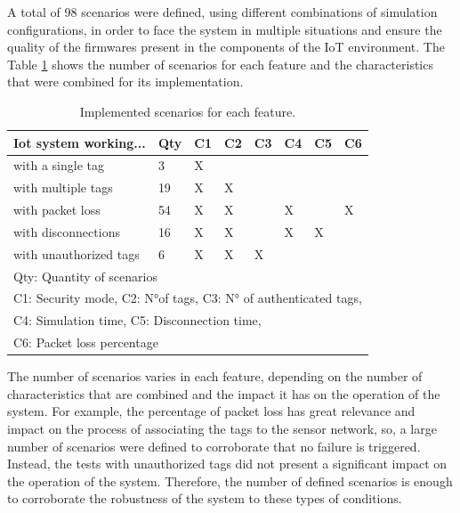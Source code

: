 \documentclass[journal]{IEEEtran}	%
\begin{document}
A total of 98 scenarios were defined, using different combinations of simulation configurations, in order to face the system in multiple situations and ensure the quality of the firmwares present in the components of the IoT environment. The Table \ref{tab:scearios} shows the number of scenarios for each feature and the characteristics that were combined for its implementation.

\begin{table}[h!]
\renewcommand{\arraystretch}{1.25}		%
\centering
\caption{Implemented scenarios for each feature.}	%
\label{tab:scearios}
\begin{tabular}{l|l|l|l|l|l|l|l}					%
\hline \hline
\textbf{Iot system working...}     &   \textbf{Qty}     &	\textbf{C1}     &\textbf{C2}    &\textbf{C3}    &\textbf{C4}    &\textbf{C5}    &\textbf{C6}\\
\hline
with a single tag               &   3   	            &	X   &   &   &   &   &   \\
with multiple tags              &   19  	            &	X   & X &   &   &   &   \\
with packet loss                &   54   	            &	X   & X &   & X &   & X \\
with disconnections      &   16   	            &	X   & X &   & X & X &   \\
with unauthorized tags          &   6   	            &	X   & X & X &   &   &   \\
\hline
\multicolumn{8}{l}{Qty: Quantity of scenarios}	\\
\multicolumn{8}{l}{C1: Security mode, C2: N°of tags, C3: N° of authenticated tags,}	\\
\multicolumn{8}{l}{C4: Simulation time, C5: Disconnection time,}	\\
\multicolumn{8}{l}{C6: Packet loss percentage}	\\
\hline \hline
\end{tabular}
\end{table}

The number of scenarios varies in each feature, depending on the number of characteristics that are combined and the impact it has on the operation of the system. For example, the percentage of packet loss has great relevance and impact on the process of associating the tags to the sensor network, so, a large number of scenarios were defined to corroborate that no failure is triggered. Instead, the tests with unauthorized tags did not present a significant impact on the operation of the system. Therefore, the number of defined scenarios is enough to corroborate the robustness of the system to these types of conditions.
\end{document}
